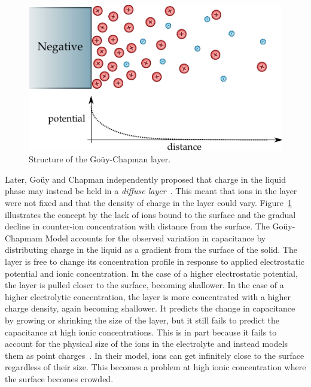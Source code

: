     \begin{figure}
      \begin{center}
        \includegraphics{content/introduction/graphics/model_guoyChapman}
      \end{center}
      \caption{Structure of the Goüy-Chapman layer.}
      \label{fig:doubleLayerModel_gouyChapman}
    \end{figure}
    Later, Goüy and Chapman independently proposed that charge in the liquid phase may instead be held in a \emph{diffuse layer}~\cite{Chapman1913}.
    This meant that ions in the layer were not fixed and that the density of charge in the layer could vary.
    Figure~\ref{fig:doubleLayerModel_gouyChapman} illustrates the concept by the lack of ions bound to the surface and the gradual decline in counter-ion concentration with distance from the surface.
    The Goüy-Chapmam Model accounts for the observed variation in capacitance by distributing charge in the liquid as a gradient from the surface of the solid.
    The layer is free to change its concentration profile in response to applied electrostatic potential and ionic concentration.
    In the case of a higher electrostatic potential, the layer is pulled closer to the surface, becoming shallower.
    In the case of a higher electrolytic concentration, the layer is more concentrated with a higher charge density, again becoming shallower.
    It predicts the change in capacitance by growing or shrinking the size of the layer, but it still fails to predict the capacitance at high ionic concentrations.
    This is in part because it fails to account for the physical size of the ions in the electrolyte and instead models them as point charges~\cite{Bard1980}.
    In their model, ions can get infinitely close to the surface regardless of their size.
    This becomes a problem at high ionic concentration where the surface becomes crowded.

